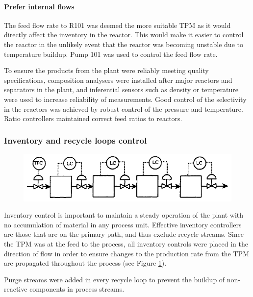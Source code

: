 \paragraph{Prefer internal flows}
The feed flow rate to R101 was deemed the more suitable TPM as it would directly affect the inventory in the reactor. This would make it easier to control the reactor in the unlikely event that the reactor was becoming unstable due to temperature buildup. Pump 101 was used to control the feed flow rate.

To ensure the products from the plant were reliably meeting quality specifications, composition analysers were installed after major reactors and separators in the plant, and inferential sensors such as density or temperature were used to increase reliability of measurements. Good control of the selectivity in the reactors was achieved by robust control of the pressure and temperature. Ratio controllers maintained correct feed ratios to reactors.

\subsubsection{Inventory and recycle loops control}

\begin{figure}
    \centering
    \includegraphics[width=\linewidth]{chapters/4-operation-control/4-Figures/TPM-Price-1994.png}
    \caption{}
    \label{fig:TPM}
\end{figure}

Inventory control is important to maintain a steady operation of the plant with no accumulation of material in any process unit. Effective inventory controllers are those that are on the primary path, and thus exclude recycle streams. Since the TPM was at the feed to the process, all inventory controls were placed in the direction of flow in order to ensure changes to the production rate from the TPM are propagated throughout the process (see Figure \ref{fig:TPM}). 

Purge streams were added in every recycle loop to prevent the buildup of non-reactive components in process streams.  



